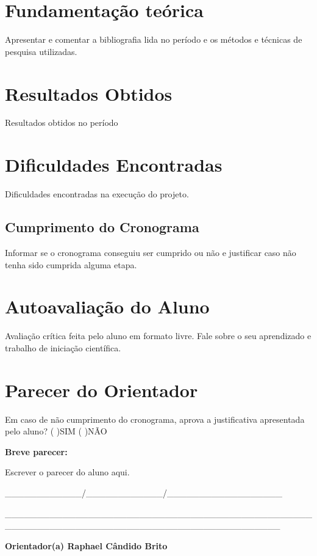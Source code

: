 \documentclass[12pt]{article}
\begin{document}
\section{Fundamentação teórica}
Apresentar e comentar a bibliografia lida no período e os métodos e técnicas de pesquisa utilizadas.


\section{Resultados Obtidos}
Resultados obtidos no período


\section{Dificuldades Encontradas}
Dificuldades encontradas na execução do projeto.


\subsection{Cumprimento do Cronograma}
Informar se o cronograma conseguiu ser cumprido ou não e justificar caso não tenha sido cumprida alguma etapa.

\section{Autoavaliação do Aluno}
Avaliação crítica feita pelo aluno em formato livre. Fale sobre o seu aprendizado e trabalho de iniciação científica.


\section{Parecer do Orientador}
Em caso de não cumprimento do cronograma, aprova a justificativa apresentada pelo aluno? (   )SIM (   )NÃO 

\noindent
\textbf{Breve parecer:}

Escrever o parecer do aluno aqui.



\vspace{2cm}
\begin{center}

\_\_\_\_\_\_\_\_\_\_\_\_/\_\_\_\_\_\_\_\_\_\_\_\_/\_\_\_\_\_\_\_\_\_\_\_\_\_\_\_\_\_\_
\vspace{1.5cm}

\_\_\_\_\_\_\_\_\_\_\_\_\_\_\_\_\_\_\_\_\_\_\_\_\_\_\_\_\_\_\_\_\_\_\_\_\_\_\_\_\_\_\_\_\_\_\_\_\_\_\_\_\_\_\_\_\_\_\_\_\_\_\_\_\_\_\_\_\_\_\_\_\_\_\_\_\_\_\_\_\_\_\_\_\_\_\_\_\_\_\_

\textbf{Orientador(a) Raphael Cândido Brito}
\end{center}
\end{document}
